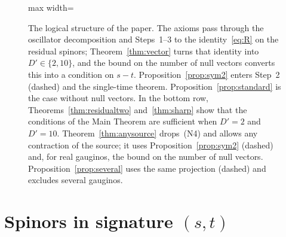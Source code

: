 \begin{figure}[t]
\begin{adjustbox}{max width=\linewidth}
\end{adjustbox}
\caption{The logical structure of the paper. The axioms pass through the oscillator decomposition and Steps~1--3 to the identity~\eqref{eq:R} on the residual spinors; Theorem~\ref{thm:vector} turns that identity into $D'\in\{2,10\}$, and the bound on the number of null vectors converts this into a condition on $s-t$. Proposition~\ref{prop:sym2} enters Step~2 (dashed) and the single-time theorem. Proposition~\ref{prop:standard} is the case without null vectors. In the bottom row, Theorems~\ref{thm:residualtwo} and~\ref{thm:sharp} show that the conditions of the Main Theorem are sufficient when $D'=2$ and $D'=10$. Theorem~\ref{thm:anysource} drops~(N4) and allows any contraction of the source; it uses Proposition~\ref{prop:sym2} (dashed) and, for real gauginos, the bound on the number of null vectors. Proposition~\ref{prop:several} uses the same projection (dashed) and excludes several gauginos.}
\label{fig:proofmap}
\end{figure}

\section{Spinors in signature \texorpdfstring{$(s,t)$}{(s,t)}}
\label{sec:spinors}

